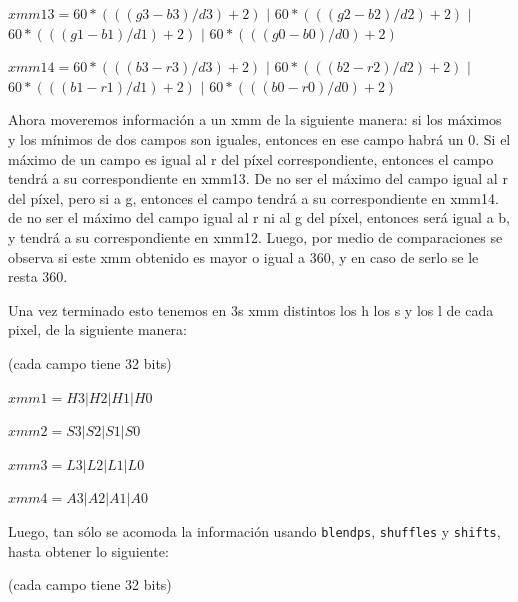 \documentclass[a4paper]{article}
\begin{document}
\begin{enumerate}
$xmm13=60*(((g3-b3)/d3)+2)$ $|$ $60*(((g2-b2)/d2)+2)$ $|$ $60*(((g1-b1)/d1)+2)$ $|$ $60*(((g0-b0)/d0)+2)$

\vspace*{0.3cm}

$xmm14=60*(((b3-r3)/d3)+2)$ $|$ $60*(((b2-r2)/d2)+2)$ $|$ $60*(((b1-r1)/d1)+2)$ $|$ $60*(((b0-r0)/d0)+2)$	
	
\vspace*{0.3cm}
	 
	 Ahora moveremos información a un xmm de la siguiente manera: si los máximos y los mínimos de dos campos son iguales, entonces en ese campo habrá un 0. Si el máximo de un campo es igual al r del píxel correspondiente, entonces el campo tendrá a su correspondiente en xmm13. De no ser el máximo del campo igual al r del píxel, pero si a g, entonces el campo tendrá a su correspondiente en xmm14. de no ser el máximo del campo igual al r ni al g del píxel, entonces será igual a b, y tendrá a su correspondiente en xmm12. Luego, por medio de comparaciones se observa si este xmm obtenido es mayor o igual a 360, y en caso de serlo se le resta 360.
	
\end{enumerate}

Una vez terminado esto tenemos en 3s xmm distintos los h los s y los l de cada pixel, de la siguiente manera:

\vspace*{0.3cm}

(cada campo tiene 32 bits)	
	
\vspace*{0.3cm}	

$xmm1 = H3|H2|H1|H0$

\vspace*{0.3cm}

$xmm2 = S3|S2|S1|S0$

\vspace*{0.3cm}

$xmm3 = L3|L2|L1|L0$

\vspace*{0.3cm}

$xmm4 = A3|A2|A1|A0$

\vspace*{0.3cm}

Luego, tan sólo se acomoda la información usando {\tt blendps}, {\tt shuffles} y {\tt shifts}, hasta obtener lo siguiente:

 \vspace*{0.3cm}

(cada campo tiene 32 bits)	
	
\end{document}
